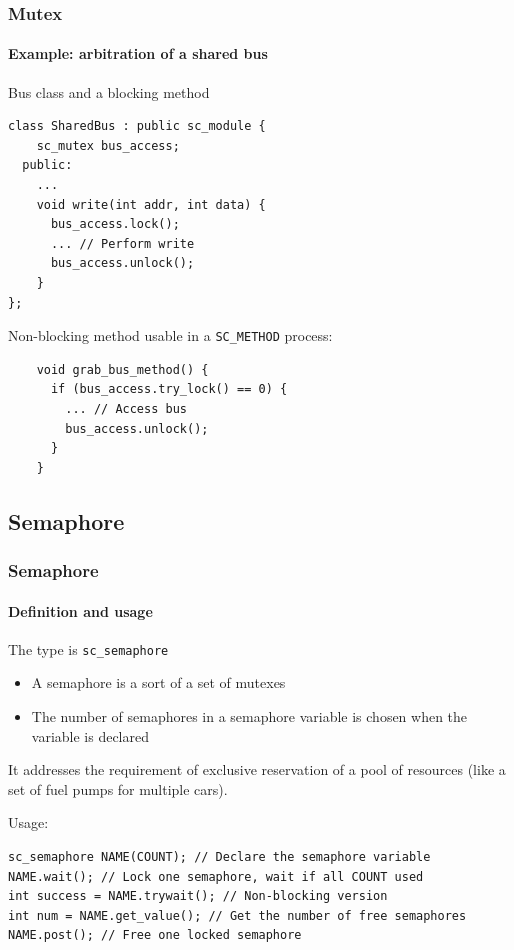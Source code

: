 \begin{frame}[fragile]
\frametitle{Mutex}
\framesubtitle{Example: arbitration of a shared bus}
\begin{block}{Bus class and a blocking method}
\vspace{-1em}
{\scriptsize 
\begin{verbatim}
class SharedBus : public sc_module {
    sc_mutex bus_access;
  public: 
    ...
    void write(int addr, int data) {
      bus_access.lock();
      ... // Perform write
      bus_access.unlock();
    }
};
\end{verbatim}
}
\vspace{-1em}
\end{block}

\begin{block}{Non-blocking method usable in a \texttt{SC\_METHOD} process:}
\vspace{-1em}
{\scriptsize 
\begin{verbatim}
    void grab_bus_method() {
      if (bus_access.try_lock() == 0) {
        ... // Access bus
        bus_access.unlock();
      }
    }
\end{verbatim}
}
\vspace{-1em}
\end{block}

\end{frame}

\subsection{Semaphore}

\begin{frame}[fragile]
\frametitle{Semaphore}
\framesubtitle{Definition and usage}

\begin{block}{The type is \texttt{sc\_semaphore}}
\begin{itemize}
\item A semaphore is a sort of a set of mutexes
\item The number of semaphores in a semaphore variable is chosen when the variable is declared
\end{itemize}
It addresses the requirement of exclusive reservation of a pool of resources (like a set of fuel pumps for multiple cars).
\end{block}
\pause
\begin{block}{Usage:}
\vspace{-1em}
{\scriptsize 
\begin{verbatim}
sc_semaphore NAME(COUNT); // Declare the semaphore variable
NAME.wait(); // Lock one semaphore, wait if all COUNT used
int success = NAME.trywait(); // Non-blocking version
int num = NAME.get_value(); // Get the number of free semaphores
NAME.post(); // Free one locked semaphore
\end{verbatim}
}
\vspace{-1em}
\end{block}
\end{frame}

